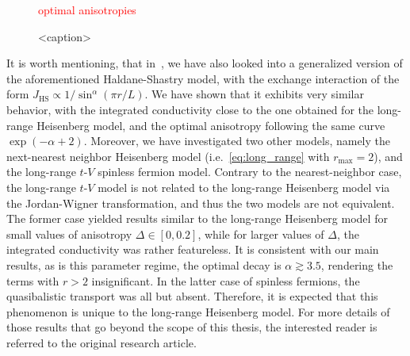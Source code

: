 \begin{figure}[htbp]
  \centering
  \textcolor{red}{optimal anisotropies}
  \caption{<caption>}
  \label{fig:optimal_anisotropy}
\end{figure}


It is worth mentioning, that in~\textcite{Mierzejewski2023},
we have also looked into a generalized version of the aforementioned Haldane-Shastry model,
with the exchange interaction of the form \(J_{\mathrm{HS}} \propto 1/\sin^{\alpha}(\pi r/L)\).
We have shown that it exhibits very similar behavior, with the integrated conductivity
close to the one obtained for the long-range Heisenberg model, and the optimal anisotropy
following the same curve \(\exp(-\alpha + 2)\). Moreover, we have investigated two other
models, namely the next-nearest neighbor Heisenberg model (i.e.~\eqref{eq:long_range} with \(r_\mathrm{max} = 2\)),
and the long-range \(t\)-\(V\) spinless fermion model.
Contrary to the nearest-neighbor case, the long-range \(t\)-\(V\) model is not related to the long-range
Heisenberg model via the Jordan-Wigner transformation, and thus the two models are not equivalent.
The former case yielded results similar to the long-range Heisenberg model for small values
of anisotropy \(\Delta\in\left[0,0.2\right]\), while for larger values of \(\Delta\), the integrated conductivity
was rather featureless. It is consistent with our main results, as is this parameter regime, the optimal
decay is \(\alpha \gtrsim 3.5\), rendering the terms with \(r > 2\) insignificant.
In the latter case of spinless fermions, the quasibalistic transport was all but absent. Therefore,
it is expected that this phenomenon is unique to the long-range Heisenberg model.
For more details of those results that go beyond the scope of this thesis, the interested reader is referred to
the original research article.
